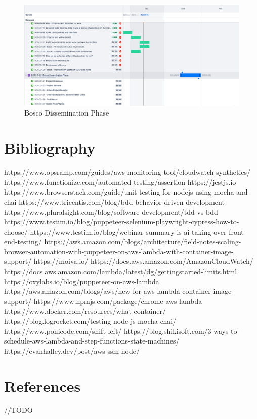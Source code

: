 \documentclass[12pt,a4paper,titlepage]{report}
\begin{document}
\begin{figure}[h]
  \centering
  \includegraphics[width=15cm]{./diagrams/sprints2.png}
  \caption{Bosco Dissemination Phase}
\end{figure}

\chapter{Bibliography}

https://www.opsramp.com/guides/aws-monitoring-tool/cloudwatch-synthetics/
https://www.functionize.com/automated-testing/assertion
https://jestjs.io
https://www.browserstack.com/guide/unit-testing-for-nodejs-using-mocha-and-chai
https://www.tricentis.com/blog/bdd-behavior-driven-development
https://www.pluralsight.com/blog/software-development/tdd-vs-bdd
https://www.testim.io/blog/puppeteer-selenium-playwright-cypress-how-to-choose/
https://www.testim.io/blog/webinar-summary-is-ai-taking-over-front-end-testing/
https://aws.amazon.com/blogs/architecture/field-notes-scaling-browser-automation-with-puppeteer-on-aws-lambda-with-container-image-support/
https://moiva.io/
https://docs.aws.amazon.com/AmazonCloudWatch/
https://docs.aws.amazon.com/lambda/latest/dg/gettingstarted-limits.html
https://oxylabs.io/blog/puppeteer-on-aws-lambda
https://aws.amazon.com/blogs/aws/new-for-aws-lambda-container-image-support/
https://www.npmjs.com/package/chrome-aws-lambda
https://www.docker.com/resources/what-container/
https://blog.logrocket.com/testing-node-js-mocha-chai/
https://www.ponicode.com/shift-left/
https://blog.shikisoft.com/3-ways-to-schedule-aws-lambda-and-step-functions-state-machines/
https://evanhalley.dev/post/aws-ssm-node/

\chapter{References}
//TODO
\end{document}
